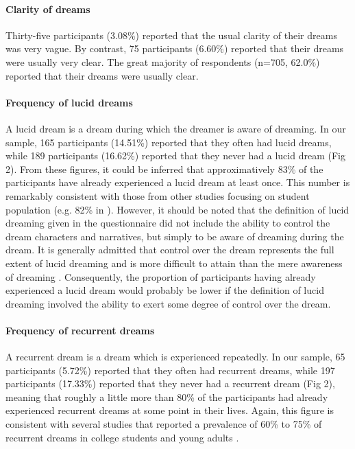 \paragraph{Clarity of dreams}
Thirty-five participants (3.08\%) reported that the usual clarity of their dreams was very vague. By contrast, 75 participants (6.60\%) reported that their dreams were usually very clear. The great majority of respondents (n=705, 62.0\%) reported that their dreams were usually clear.

\paragraph{Frequency of lucid dreams}
A lucid dream is a dream during which the dreamer is aware of dreaming. In our sample, 165 participants (14.51\%) reported that they often had lucid dreams, while 189 participants (16.62\%) reported that they never had a lucid dream (Fig 2). From these figures, it could be inferred that approximatively 83\% of the participants have already experienced a lucid dream at least once. This number is remarkably consistent with those from other studies focusing on student population (e.g. 82\% in \citealp{schredl_lucid_2004}). However, it should be noted that the definition of lucid dreaming given in the questionnaire did not include the ability to control the dream characters and narratives, but simply to be aware of dreaming during the dream. It is generally admitted that control over the dream represents the full extent of lucid dreaming and is more difficult to attain than the mere awareness of dreaming \citep{purcell_dream_1986, laberge_exploring_1991}. Consequently, the proportion of participants having already experienced a lucid dream would probably be lower if the definition of lucid dreaming involved the ability to exert some degree of control over the dream.

\paragraph{Frequency of recurrent dreams}
A recurrent dream is a dream which is experienced repeatedly. In our sample, 65 participants (5.72\%) reported that they often had recurrent dreams, while 197 participants (17.33\%) reported that they never had a recurrent dream (Fig 2), meaning that roughly a little more than 80\% of the participants had already experienced recurrent dreams at some point in their lives. Again, this figure is consistent with several studies that reported a prevalence of 60\% to 75\% of recurrent dreams in college students and young adults \citep{zadra_recurrent_1996}.


